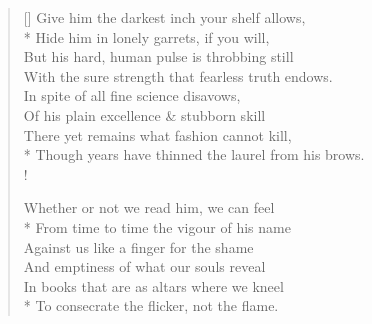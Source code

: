 \documentclass[MAIN]{subfiles}
\begin{document}
\settowidth{\versewidth}{When you are old \& grey \& full of sleep,}
\begin{verse}[\versewidth]
Give him the darkest inch your shelf allows,\\*
\vin Hide him in lonely garrets, if you will,\\
\vin But his hard, human pulse is throbbing still\\
With the sure strength that fearless truth endows.\\
In spite of all fine science disavows,\\
\vin Of his plain excellence \& stubborn skill\\
\vin There yet remains what fashion cannot kill,\\*
Though years have thinned the laurel from his brows.\\!

Whether or not we read him, we can feel\\*
\vin From time to time the vigour of his name\\
\vin Against us like a finger for the shame\\
And emptiness of what our souls reveal\\
In books that are as altars where we kneel\\*
\vin To consecrate the flicker, not the flame.
\end{verse}
\end{document}
